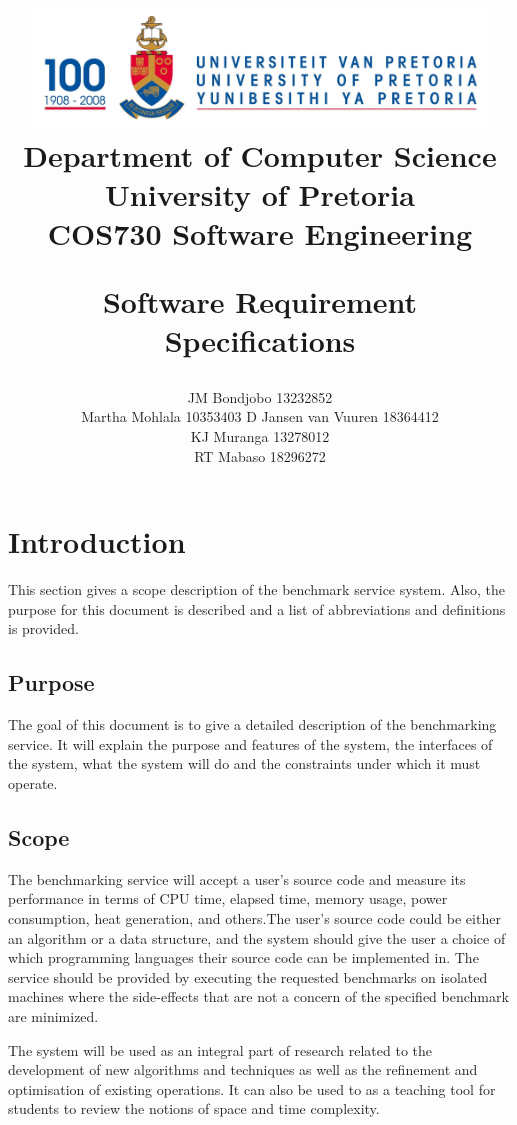 \documentclass[a4paper,12pt]{article}
\title{\includegraphics[width=12cm]{Eeufeeslogo.jpg} \\
       Department of Computer Science \\
       University of Pretoria \\
       \vspace{0.5cm}
       COS730 Software Engineering \\
       \vspace{0.5cm}
       \begin{large} \textbf{Software Requirement Specifications}\end{large}}
\date{}
\author{	JM Bondjobo		13232852 		\\
		Martha Mohlala		10353403
		D Jansen van Vuuren	18364412
		 \\
		 KJ Muranga         13278012        \\
		 RT Mabaso          18296272
}
\begin{document}
\maketitle
\thispagestyle{empty}
\clearpage

\newpage
{}
\thispagestyle{empty}
\tableofcontents
\clearpage

\newpage
{}

\section {Introduction}
This section gives a scope description of the benchmark service system. Also, the purpose for this document is described and a list of abbreviations and definitions is provided.
\subsection{Purpose}
The goal of this document is to give a detailed description of the  benchmarking service. It will explain the purpose and features of the system, the interfaces of the system, what the system will do and the constraints under which it must operate.


\subsection{Scope}
The benchmarking service will accept a user's source code and measure its performance in terms of CPU time, elapsed time, memory usage, power consumption, heat generation, and others.The user's source code could be either an algorithm or a data structure, and the system should give the user a choice of which programming languages their source code can be implemented in. The service should be provided by executing the requested benchmarks on isolated machines where the side-effects that are not a concern of the specified benchmark are minimized.

The system will be used as an integral part of research related to the development of new algorithms and techniques as well as the refinement and optimisation of existing operations. It can also be used to as a teaching tool for students to review the notions of space and time complexity.
\end{document}
